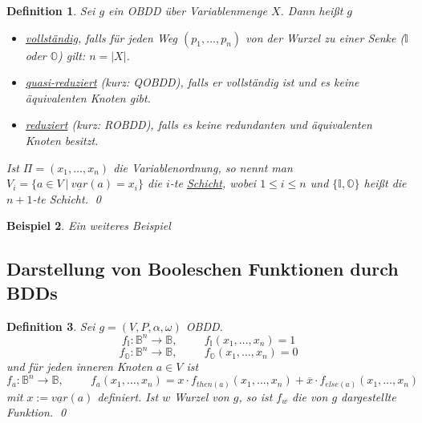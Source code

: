 \documentclass[ngerman]{scrartcl}
\theoremstyle{custom}
\newtheorem{mdef}{Definition} \numberwithin{mdef}{subsection}
\newtheorem{mex}[mdef]{Beispiel}
\newcommand{\0}{\mathbf{0}}
\newcommand{\1}{\mathbf{L}}
\begin{document}
\begin{mdef}
Sei $g$ ein OBDD \"uber Variablenmenge $X$. Dann hei\ss t $g$
\begin{itemize}
\item[(1)] \underline{vollst\"andig}, falls f\"ur jeden Weg
  $(p_1,\dots,p_n)$ von der Wurzel zu einer Senke ($\mathds{I}$ oder
  $\mathds{O}$) gilt: $n = \vert X \vert$.
\item[(2)] \underline{quasi-reduziert} (kurz: QOBDD), falls er
  vollst\"andig ist und es keine \"aquivalenten Knoten gibt.
\item[(3)] \underline{reduziert} (kurz: ROBDD), falls es keine
  redundanten und \"aquivalenten Knoten besitzt.
\end{itemize}
Ist $\Pi = (x_1, \dots, x_n)$ die Variablenordnung, so nennt man
$V_i=\{a \in V ~\vert~ \underline{var}(a)=x_i\}$ die $i$-te
\underline{Schicht}, wobei $1 \leq i \leq n$ und $\{\mathds{I},
\mathds{O}\}$ hei\ss t die $n+1$-te Schicht.
\qed
\end{mdef}

\begin{mex}
Ein weiteres Beispiel
\end{mex}

\subsection{Darstellung von Booleschen Funktionen durch BDDs}
\begin{mdef}
Sei $g=(V,P,\alpha,\omega)$ OBDD.
\begin{equation*}
f_{\mathds{I}}: \mathds{B}^n \rightarrow \mathds{B}, \hspace{1cm}
f_{\mathds{I}}(x_1,\dots, x_n)=1
\end{equation*}
\begin{equation*}
f_{\mathds{O}}: \mathds{B}^n \rightarrow \mathds{B}, \hspace{1cm}
f_{\mathds{O}}(x_1,\dots, x_n)=0
\end{equation*}
und f\"ur jeden inneren Knoten $a \in V$ ist
\begin{equation*}
f_a : \mathds{B}^n \rightarrow \mathds{B}, \hspace{1cm}
f_a(x_1,\dots,x_n) = x \cdot f_{then(a)}(x_1,\dots,x_n) + \overline{x}
\cdot f_{else(a)}(x_1,\dots,x_n)
\end{equation*}
mit $x:=\underline{var}(a)$ definiert. Ist $w$ Wurzel von $g$, so ist
$f_w$ die von $g$ dargestellte Funktion.
\qed
\end{mdef}
\end{document}
